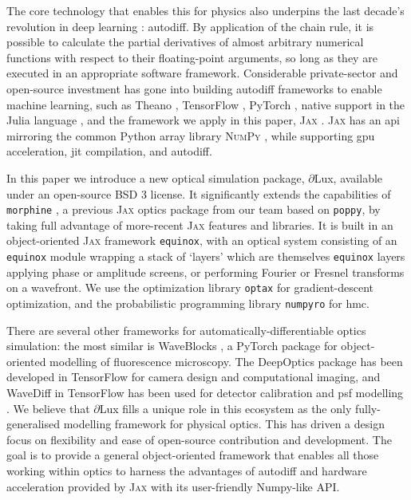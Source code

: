 \documentclass[twocolumn]{spie}
\newcommand\jax{\textsc{Jax}\xspace}
\newcommand\dlux{$\partial$Lux\xspace}
\newcommand\equinox{\texttt{equinox}\xspace}
\newcommand\optax{\texttt{optax}\xspace}
\newcommand\numpyro{\texttt{numpyro}\xspace}
\begin{document}
The core technology that enables this for physics also underpins the last decade's revolution in deep learning \cite{lecun15}: autodiff. By application of the chain rule, it is possible to calculate the partial derivatives of almost arbitrary numerical functions with respect to their floating-point arguments, so long as they are executed in an appropriate software framework. 
Considerable private-sector and open-source investment has gone into building autodiff frameworks to enable machine learning, such as Theano \cite{theano}, TensorFlow \cite{tensorflow2015}, PyTorch \cite{pytorch}, native support in the Julia language \cite{julia}, and the framework we apply in this paper, \textsc{Jax} \cite{jax}. \jax has an \ac{api} mirroring the common Python array library \textsc{NumPy} \cite{numpy}, while supporting \ac{gpu} acceleration, \ac{jit} compilation, and autodiff.

In this paper we introduce a new optical simulation package, \dlux, available under an open-source BSD 3 license. It significantly extends the capabilities of \texttt{morphine} \cite{pope2021,phase_ret_and_design}, a previous \jax optics package from our team based on \texttt{poppy}, by taking full advantage of more-recent \jax features and libraries.  It is built in an object-oriented \jax framework \equinox \cite{kidger2021equinox}, with an optical system consisting of an \equinox module wrapping a stack of `layers' which are themselves \equinox layers applying phase or amplitude screens, or performing Fourier or Fresnel transforms on a wavefront. We use the optimization library \optax \cite{optax2020github} for gradient-descent optimization, and the probabilistic programming library \numpyro \cite{Phan2019} for \ac{hmc}.



There are several other frameworks for automatically-differentiable optics simulation:
the most similar is WaveBlocks \cite{page2020}, a PyTorch package for object-oriented modelling of fluorescence microscopy. 
The DeepOptics package \cite{sitzmann2018} has been developed in TensorFlow for camera design and computational imaging, and
WaveDiff in TensorFlow has been used for detector calibration \cite{liaudat2021} and \ac{psf} modelling \cite{Liaudat2022}. 
We believe that \dlux fills a unique role in this ecosystem as the only fully-generalised modelling framework for physical optics. This has driven a design focus on flexibility and ease of open-source contribution and development. The goal is to provide a general object-oriented framework that enables all those working within optics to harness the advantages of autodiff and hardware acceleration provided by \jax with its user-friendly Numpy-like API.
\end{document}
